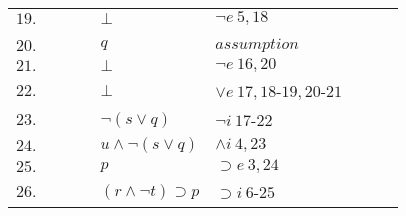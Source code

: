 \documentclass[12pt]{article}
\begin{document}
\begin{itemize}
\begin{table}[H]
\begin{tabular}{*9{l}}
			$19.$ & \multicolumn{1}{|c}{} & \multicolumn{1}{|c}{} & \multicolumn{1}{|c}{} & $\bot$ & $\neg e \ 5, 18$ & \multicolumn{1}{|c}{} & \multicolumn{1}{c|}{} & \multicolumn{1}{c|}{}\\
			
			\cline{4-6}
			
			\vspace{-12 pt}
			
			
			 & \multicolumn{1}{|c}{} & \multicolumn{1}{|c}{} & & & & & \multicolumn{1}{c|}{} &\multicolumn{1}{c|}{}\\ \cline{4-6}
			
			$20.$ & \multicolumn{1}{|c}{} & \multicolumn{1}{|c}{} & \multicolumn{1}{|c}{} & $q$ & $assumption$ & \multicolumn{1}{|c}{} & \multicolumn{1}{c|}{} &\multicolumn{1}{c|}{}\\
			
			$21.$ & \multicolumn{1}{|c}{} & \multicolumn{1}{|c}{} & \multicolumn{1}{|c}{} & $\bot$ & $\neg e \ 16, 20$ & \multicolumn{1}{|c}{} & \multicolumn{1}{c|}{} & \multicolumn{1}{c|}{}\\
			
			\cline{4-6}
			
			$22.$ & \multicolumn{1}{|c}{} & \multicolumn{1}{|c}{} & & $\bot$ & $\lor e \ 17, 18$-$19, 20$-$21$ & & \multicolumn{1}{c|}{} & \multicolumn{1}{c|}{}\\
			
			\cline{3-8}
			
			$23.$ & \multicolumn{1}{|c}{} & & & $\neg (s \lor q)$ & $\neg i \ 17$-$22$ & & & \multicolumn{1}{c|}{}\\
			
			$24.$ & \multicolumn{1}{|c}{} & & & $u \land \neg (s \lor q)$ & $\land i \ 4, 23$ & & & \multicolumn{1}{c|}{}\\
			
			$25.$ & \multicolumn{1}{|c}{} & & & $p$ & $\supset e \ 3, 24$ & & & \multicolumn{1}{c|}{}\\
			
			\cline{2-9}
			
			$26.$ & & & & $(r \land \neg t) \supset p$ & $\supset i \ 6$-$25$ & & & \\
			
			
		
		\end{tabular}
		\end{table}
		
		
		
		
		

\end{itemize}
\end{document}
